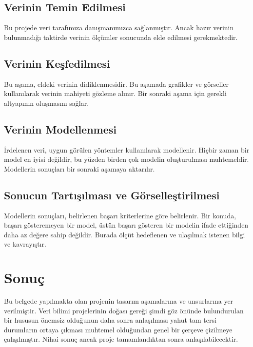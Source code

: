 \documentclass[12pt,a4paper]{article}
\begin{document}
    \subsection{Verinin Temin Edilmesi}
    Bu projede veri tarafımıza danışmanımızca sağlanmıştır. Ancak hazır verinin
    bulunmadığı taktirde verinin ölçümler sonucunda elde edilmesi gerekmektedir.

    \subsection{Verinin Keşfedilmesi}
    Bu aşama, eldeki verinin didiklenmesidir. Bu aşamada grafikler ve görseller
    kullanılarak verinin mahiyeti gözleme alınır. Bir sonraki aşama için gerekli
    altyapının oluşmasını sağlar.

    \subsection{Verinin Modellenmesi}
    İrdelenen veri, uygun görülen yöntemler kullanılarak modellenir. Hiçbir zaman
    bir model en iyisi değildir, bu yüzden birden çok modelin oluşturulması
    muhtemeldir. Modellerin sonuçları bir sonraki aşamaya aktarılır.

    \subsection{Sonucun Tartışılması ve Görselleştirilmesi}
    Modellerin sonuçları, belirlenen başarı kriterlerine göre belirlenir.
    Bir konuda, başarı gösteremeyen bir model,  üstün başarı gösteren
    bir modelin ifade ettiğinden daha az değere sahip değildir. Burada ölçüt
    hedeflenen ve ulaşılmak istenen bilgi ve kavrayıştır.

    \section{Sonuç}
    Bu belgede yapılmakta olan projenin tasarım aşamalarına ve unsurlarına yer verilmiştir.
    Veri bilimi projelerinin doğası gereği şimdi göz önünde bulundurulan bir hususun
    önemsiz olduğunun daha sonra anlaşılması yahut tam tersi durumların ortaya çıkması
    muhtemel olduğundan genel bir çerçeve çizilmeye çalışılmıştır. Nihai sonuç ancak
    proje tamamlandıktan sonra anlaşılabilecektir.

    \newpage
    
    
\end{document}
